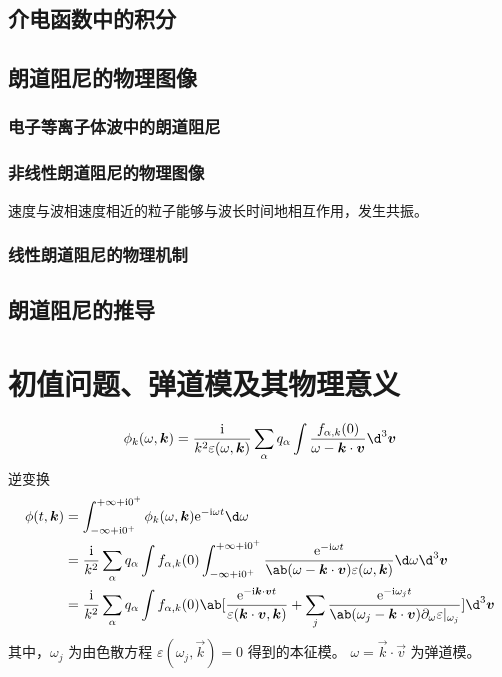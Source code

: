\subsection{介电函数中的积分}

\subsection{朗道阻尼的物理图像}

\subsubsection{电子等离子体波中的朗道阻尼}

\subsubsection{非线性朗道阻尼的物理图像}

速度与波相速度相近的粒子能够与波长时间地相互作用，发生共振。

\subsubsection{线性朗道阻尼的物理机制}

\subsection{朗道阻尼的推导}

\section{初值问题、弹道模及其物理意义}

\begin{equation}
\phi_k(\omega, \vec{k}) = \frac{\im}{k^2 \varepsilon(\omega, \vec{k})} \sum_\alpha q_\alpha \int \frac{f_{\alpha,k}(0)}{\omega - \vec{k} \cdot \vec{v}} \d^3 \vec{v}
\end{equation}
逆变换
\begin{equation}\begin{aligned}
\phi(t, \vec{k}) &=
\int_{-\infty+\im 0^+}^{+\infty+\im 0^+}
\phi_k(\omega, \vec{k}) \eu^{-\im\omega t} \d \omega \\
&= \frac{\im}{k^2} \sum_\alpha q_\alpha
\int f_{\alpha,k}(0) \int_{-\infty+\im 0^+}^{+\infty+\im 0^+}
    \frac{\eu^{-\im\omega t}}{
        \ab(\omega - \vec{k} \cdot \vec{v})
        \varepsilon(\omega, \vec{k})
    } \d \omega
\d^3 \vec{v} \\
&= \frac{\im}{k^2} \sum_\alpha q_\alpha
\int f_{\alpha,k}(0) \ab[
    \frac{
        \eu^{-\im \vec{k} \cdot \vec{v} t}
    }{\varepsilon(\vec{k} \cdot \vec{v}, \vec{k})}
    + \sum_j \frac{
        \eu^{-\im \omega_j t}
    }{
        \ab(\omega_j - \vec{k} \cdot \vec{v})
        \pdv{\varepsilon}!{\omega}|_{\omega_j}
    }
] \d^3 \vec{v}
\end{aligned}\end{equation}
其中，$\omega_j$ 为由色散方程 $\varepsilon(\omega_j, \vec{k}) = 0$ 得到的本征模。
$\omega = \vec{k} \cdot \vec{v}$ 为弹道模。

